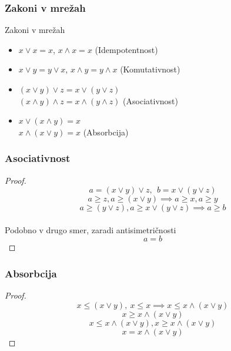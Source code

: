 \documentclass[slovene]{beamer}
\begin{document}
\begin{frame}
\frametitle{Zakoni v mrežah}
\begin{block}{Zakoni v mrežah}
\begin{itemize}
\item $x \lor x = x$, $x \land x = x$ (Idempotentnost)
\item $x \lor y = y \lor x$, $x \land y = y \land x$ (Komutativnost)
\item $(x \lor y) \lor z = x \lor (y \lor z)$\\ $(x \land y) \land z = x \land (y \land z)$ (Asociativnost)
\item $ x \lor (x \land y) = x$\\ $x \land (x \lor y) = x$ (Absorbcija)
\end{itemize}
\end{block}
\end{frame}


\begin{frame}
\frametitle{Asociativnost}
\begin{proof}
$$a = (x \lor y) \lor z, \ \ b = x \lor (y \lor z)$$ 
$$a \geq z, a \geq (x \lor y) \implies a \geq x, a \geq y$$\pause 
$$a \geq (y \lor z), a \geq x \lor (y \lor z) \implies a \geq b $$ \\ 
\centering Podobno v drugo smer, zaradi antisimetričnosti
$$ a = b$$

\end{proof}

\end{frame}

\begin{frame}
\frametitle{Absorbcija}


\begin{proof}
$$ x \leq (x \lor y), \ x \leq x \implies x \leq x \land (x \lor y)$$
$$x \geq x \land (x \lor y)$$
$$x \leq x \land (x \lor y), x \geq x \land (x \lor y)$$ \pause
$$x = x \land (x \lor y)$$
\end{proof}

\end{frame}
\end{document}
